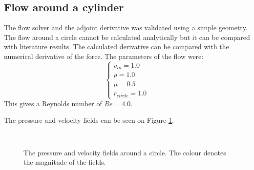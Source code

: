 \documentclass[12pt, a4paper]{article}
\begin{document}
    \subsection{Flow around a cylinder}
        The flow solver and the adjoint derivative was validated using a simple geometry. The flow around a circle cannot be calculated analytically but it can be compared with literature results. The calculated derivative can be compared with the numerical derivative of the force. The parameters of the flow were:
        \begin{equation}
        \begin{cases}
        v_{in} = 1.0 \\
        \rho = 1.0 \\
        \mu = 0.5 \\
        r_{circle} = 1.0
        \end{cases}
        \end{equation}
        This gives a Reynolds number of $Re = 4.0$.
        
        The pressure and velocity fields can be seen on Figure \ref{fig_circle}.
        \begin{figure}[htbp]
            \centering
             \\
            \caption{The pressure and velocity fields around a circle. The colour denotes the magnitude of the fields.}
            \label{fig_circle}
        \end{figure}
        
\end{document}
